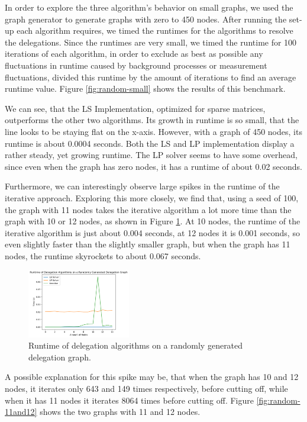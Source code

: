 In order to explore the three algorithm's behavior on small graphs, we used the graph generator to generate graphs with zero to 450 nodes. After running the set-up each algorithm requires, we timed the runtimes for the algorithms to resolve the delegations. Since the runtimes are very small, we timed the runtime for 100 iterations of each algorithm, in order to exclude as best as possible any fluctuations in runtime caused by background processes or measurement fluctuations, divided this runtime by the amount of iterations to find an average runtime value. Figure \ref{fig:random-small} shows the results of this benchmark.

We can see, that the LS Implementation, optimized for sparse matrices, outperforms the other two algorithms. Its growth in runtime is so small, that the line looks to be staying flat on the x-axis. However, with a graph of 450 nodes, its runtime is about 0.0004 seconds. Both the LS and LP implementation display a rather steady, yet growing runtime. The LP solver seems to have some overhead, since even when the graph has zero nodes, it has a runtime of about 0.02 seconds.

Furthermore, we can interestingly observe large spikes in the runtime of the iterative approach. Exploring this more closely, we find that, using a seed of 100, the graph with 11 nodes takes the iterative algorithm a lot more time than the graph with 10 or 12 nodes, as shown in Figure \ref{fig:random-tiny}. At 10 nodes, the runtime of the iterative algorithm is just about 0.004 seconds, at 12 nodes it is 0.001 seconds, so even slightly faster than the slightly smaller graph, but when the graph has 11 nodes, the runtime skyrockets to about 0.067 seconds.

\begin{figure}[h]
    \centering
    \includegraphics[width=0.4\textwidth]{0-15_random}
    \caption{Runtime of delegation algorithms on a randomly generated delegation graph.}
    \label{fig:random-tiny}
\end{figure}

A possible explanation for this spike may be, that when the graph has 10 and 12 nodes, it iterates only 643 and 149 times respectively, before cutting off, while when it has 11 nodes it iterates 8064 times before cutting off. Figure \ref{fig:random-11and12} shows the two graphs with 11 and 12 nodes.

